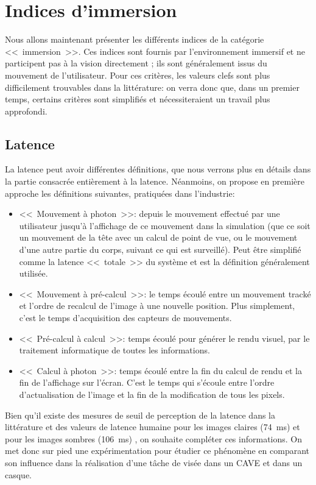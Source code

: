 \chapter{Indices d'immersion}
\par Nous allons maintenant présenter les différents indices de la catégorie <<~immersion~>>. Ces indices sont fournis par l'environnement immersif et ne participent pas à la vision directement ; ils sont généralement issus du mouvement de l'utilisateur. Pour ces critères, les valeurs clefs sont plus difficilement trouvables dans la littérature: on verra donc que, dans un premier temps, certains critères sont simplifiés et nécessiteraient un travail plus approfondi.
	
	\section{Latence}
	\par La latence peut avoir différentes définitions, que nous verrons plus en détails dans la partie consacrée entièrement à la latence. Néanmoins, on propose en première approche les définitions suivantes, pratiquées dans l'industrie:
	\begin{itemize}
		\item <<~Mouvement à photon~>>: depuis le mouvement effectué par une utilisateur jusqu'à l'affichage de ce mouvement dans la simulation (que ce soit un mouvement de la tête avec un calcul de point de vue, ou le mouvement d'une autre partie du corps, suivant ce qui est surveillé). Peut être simplifié comme la latence <<~totale~>> du système et est la définition généralement utilisée.
		\item <<~Mouvement à pré-calcul~>>: le temps écoulé entre un mouvement tracké et l'ordre de recalcul de l'image à une nouvelle position. Plus simplement, c'est le temps d'acquisition des capteurs de mouvements.
		\item <<~Pré-calcul à calcul~>>: temps écoulé pour générer le rendu visuel, par le traitement informatique de toutes les informations.
		\item <<~Calcul à photon~>>: temps écoulé entre la fin du calcul de rendu et la fin de l'affichage sur l'écran. C'est le temps qui s'écoule entre l'ordre d'actualisation de l'image et la fin de la modification de tous les pixels.
	\end{itemize}
	
	\par Bien qu'il existe des mesures de seuil de perception de la latence dans la littérature \citep{brooks_whats_1999,kemeny_driving_2014} et des valeurs de latence humaine pour les images claires (74~ms) et pour les images sombres (106~ms) \citep{feng_han_investigation_2010}, on souhaite compléter ces informations. On met donc sur pied une expérimentation pour étudier ce phénomène en comparant son influence dans la réalisation d'une tâche de visée dans un CAVE et dans un casque.
	
